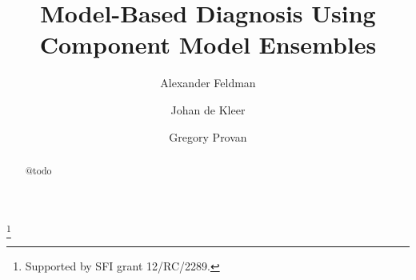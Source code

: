 \documentclass{ifacconf}
\begin{document}
%
\begin{frontmatter}
%
\title{Model-Based Diagnosis Using Component Model Ensembles}
%
\thanks[footnoteinfo]{Supported by SFI grant 12/RC/2289.}
%
\author[First]{Alexander Feldman}
\author[First]{Johan de Kleer}
\author[Second]{Gregory Provan}
%
\address[First]{PARC Inc., Palo Alto, CA 94304 (e-mail: \{afeldman,dekleer\}@parc.com)}
\address[Second]{Department of Computer Science, University College Cork, Cork, Ireland (e-mail: g.provan@ cs.ucc.ie).}
%
\begin{abstract}
@todo
\end{abstract}
\end{frontmatter}
%






%

%
\end{document}

